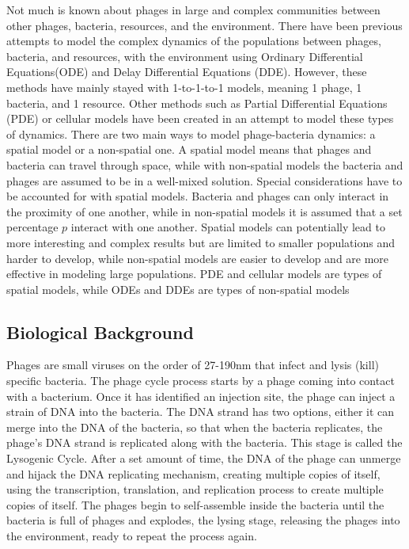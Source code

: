 Not much is known about phages in large and complex communities between other phages, bacteria, resources, and the environment. There have been previous attempts to model the complex dynamics of the populations between phages, bacteria, and resources, with the environment using Ordinary Differential Equations(ODE) and Delay Differential Equations (DDE). However, these methods have mainly stayed with 1-to-1-to-1 models, meaning 1 phage, 1 bacteria, and 1 resource. Other methods such as Partial Differential Equations (PDE) or cellular models have been created in an attempt to model these types of dynamics. There are two main ways to model phage-bacteria dynamics: a spatial model or a non-spatial one. A spatial model means that phages and bacteria can travel through space, while with non-spatial models the bacteria and phages are assumed to be in a well-mixed solution. Special considerations have to be accounted for with spatial models. Bacteria and phages can only interact in the proximity of one another, while in non-spatial models it is assumed that a set percentage $p$ interact with one another. Spatial models can potentially lead to more interesting and complex results but are limited to smaller populations and harder to develop, while non-spatial models are easier to develop and are more effective in modeling large populations. PDE and cellular models are types of spatial models, while ODEs and DDEs are types of non-spatial models \newline 

\subsection{Biological Background}
Phages are small viruses on the order of 27-190nm that infect and lysis (kill) specific bacteria. The phage cycle process starts by a phage coming into contact with a bacterium. Once it has identified an injection site, the phage can inject a strain of DNA into the bacteria. The DNA strand has two options, either it can merge into the DNA of the bacteria, so that when the bacteria replicates, the phage's DNA strand is replicated along with the bacteria. This stage is called the Lysogenic Cycle. After a set amount of time, the DNA of the phage can unmerge and hijack the DNA replicating mechanism, creating multiple copies of itself, using the transcription, translation, and replication process to create multiple copies of itself. The phages begin to self-assemble inside the bacteria until the bacteria is full of phages and explodes, the lysing stage, releasing the phages into the environment, ready to repeat the process again. 

